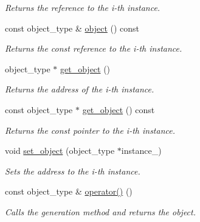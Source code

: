 \begin{DoxyCompactItemize}
\begin{DoxyCompactList}\small\item\em Returns the reference to the i-\/th instance. \end{DoxyCompactList}\item 
\hypertarget{a00366_a82ce66a317566b37db8b8b937533f0fe}{const object\-\_\-type \& \hyperlink{a00366_a82ce66a317566b37db8b8b937533f0fe}{object} () const }\label{a00366_a82ce66a317566b37db8b8b937533f0fe}

\begin{DoxyCompactList}\small\item\em Returns the const reference to the i-\/th instance. \end{DoxyCompactList}\item 
\hypertarget{a00366_a1d5d090662c1df4bff397171e7379784}{object\-\_\-type $\ast$ \hyperlink{a00366_a1d5d090662c1df4bff397171e7379784}{get\-\_\-object} ()}\label{a00366_a1d5d090662c1df4bff397171e7379784}

\begin{DoxyCompactList}\small\item\em Returns the address of the i-\/th instance. \end{DoxyCompactList}\item 
\hypertarget{a00366_ab42246762bed6cd639266c37db062ee5}{const object\-\_\-type $\ast$ \hyperlink{a00366_ab42246762bed6cd639266c37db062ee5}{get\-\_\-object} () const }\label{a00366_ab42246762bed6cd639266c37db062ee5}

\begin{DoxyCompactList}\small\item\em Returns the const pointer to the i-\/th instance. \end{DoxyCompactList}\item 
\hypertarget{a00366_a2c40f91da976ad719b3e921fc7bef4ec}{void \hyperlink{a00366_a2c40f91da976ad719b3e921fc7bef4ec}{set\-\_\-object} (object\-\_\-type $\ast$instance\-\_\-)}\label{a00366_a2c40f91da976ad719b3e921fc7bef4ec}

\begin{DoxyCompactList}\small\item\em Sets the address to the i-\/th instance. \end{DoxyCompactList}\item 
\hypertarget{a00366_a2bf8fa5346f453c69ff9bb0d0ed86440}{const object\-\_\-type \& \hyperlink{a00366_a2bf8fa5346f453c69ff9bb0d0ed86440}{operator()} ()}\label{a00366_a2bf8fa5346f453c69ff9bb0d0ed86440}

\begin{DoxyCompactList}\small\item\em Calls the generation method and returns the object. \end{DoxyCompactList}\end{DoxyCompactItemize}
